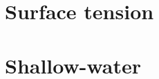 \documentclass[a4paper]{article}
\begin{document}




\section{Surface tension}








\section{Shallow-water}









\end{document}
